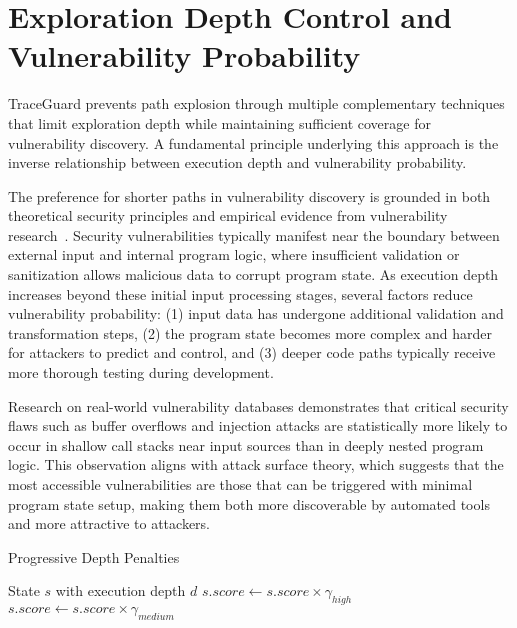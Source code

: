 \section{Exploration Depth Control and Vulnerability Probability}

TraceGuard prevents path explosion through multiple complementary techniques that limit exploration depth while maintaining sufficient coverage for vulnerability discovery. A fundamental principle underlying this approach is the inverse relationship between execution depth and vulnerability probability.

The preference for shorter paths in vulnerability discovery is grounded in both theoretical security principles and empirical evidence from vulnerability research~\cite{schwartz_all_2010}. Security vulnerabilities typically manifest near the boundary between external input and internal program logic, where insufficient validation or sanitization allows malicious data to corrupt program state. As execution depth increases beyond these initial input processing stages, several factors reduce vulnerability probability: (1) input data has undergone additional validation and transformation steps, (2) the program state becomes more complex and harder for attackers to predict and control, and (3) deeper code paths typically receive more thorough testing during development.

Research on real-world vulnerability databases demonstrates that critical security flaws such as buffer overflows and injection attacks are statistically more likely to occur in shallow call stacks near input sources than in deeply nested program logic. This observation aligns with attack surface theory, which suggests that the most accessible vulnerabilities are those that can be triggered with minimal program state setup, making them both more discoverable by automated tools and more attractive to attackers.

\begin{algorithm}[H]
    \caption{Progressive Depth Penalties}
    \label{alg:depth_penalties}
    \begin{algorithmic}[1]
        \Require State $s$ with execution depth $d$
        \State $s.score \gets s.score \times \gamma_{high}$
        \State $s.score \gets s.score \times \gamma_{medium}$
        \EndIf
    \end{algorithmic}
\end{algorithm}

